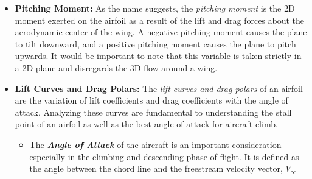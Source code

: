 \documentclass{report}
\begin{document}
\begin{itemize}
\begin{itemize}
            The equations for compressibility drag at supersonic speed are significantly more complicated, involving components related to volume, lift, and fuselage volume. It is recommended to consult an aeronautical textbook 
            for these equations. However, the basic idea of these equations is that wave drag is reduced by decreasing volume and elongating the body. In fact, it is shown that the volume component of wave drag
            is proportional according to the following relation:
            \begin{equation}
            D_w \propto \frac{volume^2}{l^4}
            \end{equation}
            Further efforts to reduce this drag can be made by reducing the fuselage volume near the wings and ensuring a smooth area distribution and minimal sharp changes. Wings are also swept back --- 
            which introduces a normal and tangential component of airflow as discussed earlier in our wing sweep definition. 

        \end{itemize}
        


    \item[] \textbf{Pitching Moment:} As the name suggests, the \textit{pitching moment} is the 2D moment exerted on the airfoil as a result of the lift and drag forces about the aerodynamic center of the wing.
    A negative pitching moment causes the plane to tilt downward, and a positive pitching moment causes the plane to pitch upwards. It would be important to note that this variable is taken strictly in a 2D plane and
    disregards the 3D flow around a wing.
    
    \item[] \textbf{Lift Curves and Drag Polars:} The \textit{lift curves and drag polars} of an airfoil are the variation of lift coefficients and drag coefficients with the angle of attack. Analyzing these
    curves are fundamental to understanding the stall point of an airfoil as well as the best angle of attack for aircraft climb. 
    
        \begin{itemize}
            \item The \textbf{\textit{Angle of Attack}} of the aircraft is an important consideration especially in the climbing and descending phase of flight. It is defined as the angle between the chord line
            and the freestream velocity vector, $V_{\infty}$
            

\end{itemize}
\end{itemize}
\end{document}
